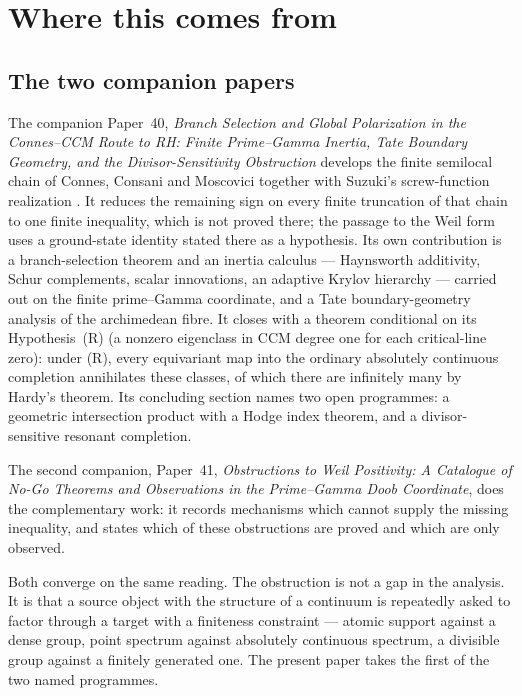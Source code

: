 \documentclass[11pt]{amsart}
\theoremstyle{definition}
\theoremstyle{remark}
\begin{document}
\section{Where this comes from}

\subsection{The two companion papers}

The companion Paper~40, \emph{Branch Selection and Global Polarization in the
Connes--CCM Route to RH: Finite Prime--Gamma Inertia, Tate Boundary
Geometry, and the Divisor-Sensitivity Obstruction} develops the finite
semilocal chain of Connes, Consani and Moscovici \cite{CCM2025} together
with Suzuki's screw-function realization \cite{Suzuki2025,SuzukiScrew}.  It
reduces the remaining sign on every finite truncation of that chain to one
finite inequality, which is not proved there; the passage to the Weil form
uses a ground-state identity stated there as a hypothesis.  Its
own contribution is a branch-selection theorem and an inertia calculus ---
Haynsworth additivity, Schur complements, scalar innovations, an adaptive
Krylov hierarchy --- carried out on the finite prime--Gamma coordinate, and
a Tate boundary-geometry analysis of the archimedean fibre.  It closes with
a theorem conditional on its Hypothesis~(R) (a nonzero eigenclass in CCM
degree one for each critical-line zero): under (R), every equivariant map
into the ordinary absolutely continuous completion annihilates these
classes, of which there are infinitely many by Hardy's theorem.  Its concluding section names two open programmes: a
geometric intersection product with a Hodge index theorem, and a
divisor-sensitive resonant completion.

The second companion, Paper~41, \emph{Obstructions to Weil Positivity: A Catalogue of
No-Go Theorems and Observations in the Prime--Gamma Doob
Coordinate}, does the complementary work: it records mechanisms which cannot supply the missing inequality, and
states which of these obstructions are proved and which are only observed.

Both converge on the same reading.  The obstruction is not a gap in the
analysis.  It is that a source object with the structure of a continuum is
repeatedly asked to factor through a target with a finiteness constraint ---
atomic support against a dense group, point spectrum against absolutely
continuous spectrum, a divisible group against a finitely generated one.
The present paper takes the first of the two named programmes.
\end{document}
